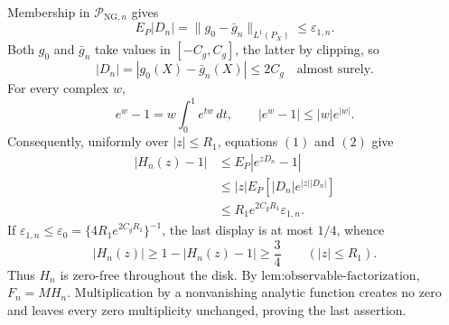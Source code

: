 Membership in \(\mathcal P_{\mathrm{NG},n}\) gives
\[
 E_P|D_n|
 =\|g_0-\bar g_n\|_{L^1(P_X)}
 \le\varepsilon_{1,n}. \tag{1}
\]
Both \(g_0\) and \(\bar g_n\) take values in \([-C_g,C_g]\), the latter by clipping, so
\[
 |D_n|=|g_0(X)-\bar g_n(X)|\le2C_g
 \quad\text{almost surely}. \tag{2}
\]
For every complex \(w\),
\[
 e^w-1=w\int_0^1e^{tw}\,dt,
 \qquad
 |e^w-1|\le |w|e^{|w|}.
\]
Consequently, uniformly over \(|z|\le R_1\), equations \((1)\) and \((2)\) give
\[
 \begin{aligned}
 |H_n(z)-1|
 &\le E_P|e^{zD_n}-1|\\
 &\le |z|E_P[|D_n|e^{|z||D_n|}]\\
 &\le R_1e^{2C_gR_1}\varepsilon_{1,n}.
 \end{aligned}
\]
If \(\varepsilon_{1,n}\le\varepsilon_0=\{4R_1e^{2C_gR_1}\}^{-1}\), the last display is at most \(1/4\), whence
\[
 |H_n(z)|\ge1-|H_n(z)-1|\ge\frac34
 \qquad (|z|\le R_1).
\]
Thus \(H_n\) is zero-free throughout the disk. By \(\text{lem:observable-factorization}\), \(F_n=M H_n\). Multiplication by a nonvanishing analytic function creates no zero and leaves every zero multiplicity unchanged, proving the last assertion.